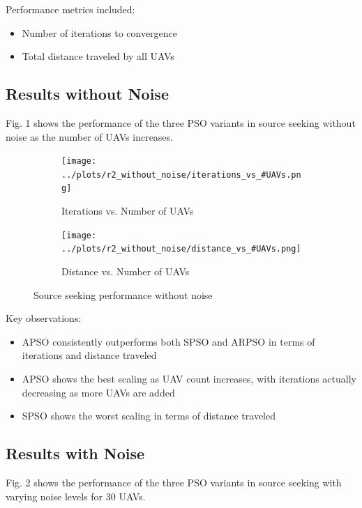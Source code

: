 \documentclass[conference]{IEEEtran}
\begin{document}
Performance metrics included:
\begin{itemize}
    \item Number of iterations to convergence
    \item Total distance traveled by all UAVs
\end{itemize}

\subsection{Results without Noise}
Fig. 1 shows the performance of the three PSO variants in source seeking without noise as the number of UAVs increases.

\begin{figure}[htbp]
\centering
\begin{subfigure}{0.49\linewidth}
    \centering
    \texttt{[image: ../plots/r2\_without\_noise/iterations\_vs\_\#UAVs.png]}
    \caption{Iterations vs. Number of UAVs}
    \label{fig:iterations_vs_uavs}
\end{subfigure}
\hfill
\begin{subfigure}{0.49\linewidth}
    \centering
    \texttt{[image: ../plots/r2\_without\_noise/distance\_vs\_\#UAVs.png]}
    \caption{Distance vs. Number of UAVs}
    \label{fig:distance_vs_uavs}
\end{subfigure}
\caption{Source seeking performance without noise}
\label{fig:source_seeking_no_noise}
\end{figure}

Key observations:
\begin{itemize}
    \item APSO consistently outperforms both SPSO and ARPSO in terms of iterations and distance traveled
    \item APSO shows the best scaling as UAV count increases, with iterations actually decreasing as more UAVs are added
    \item SPSO shows the worst scaling in terms of distance traveled
\end{itemize}

\subsection{Results with Noise}
Fig. 2 shows the performance of the three PSO variants in source seeking with varying noise levels for 30 UAVs.
\end{document}
